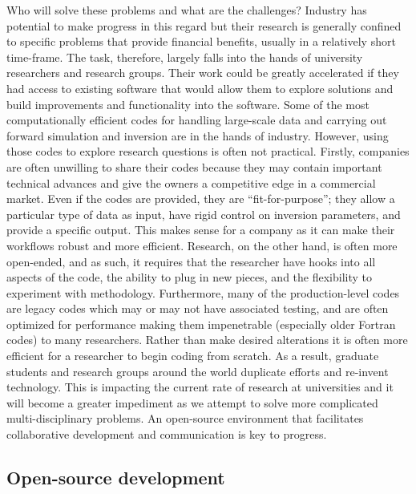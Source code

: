 \documentclass[paper]{geophysics}
\begin{document}
Who will solve these problems and what are the challenges? Industry has potential to make progress in this regard but their research is generally confined to specific problems that provide financial benefits, usually in a relatively short time-frame. The task, therefore, largely falls into the hands of university researchers and research groups. Their work could be greatly accelerated if they had access to existing software that would allow them to explore solutions and build improvements and functionality into the software. Some of the most computationally efficient codes for handling large-scale data and carrying out forward simulation and inversion are in the hands of industry. However, using those codes to explore research questions is often not practical. Firstly, companies are often unwilling to share their codes because they may contain important technical advances and give the owners a competitive edge in a commercial market. Even if the codes are provided, they are ``fit-for-purpose''; they allow a particular type of data as input, have rigid control on inversion parameters, and provide a specific output. This makes sense for a company as it can make their workflows robust and more efficient. Research, on the other hand, is often more open-ended, and as such, it requires that the researcher have hooks into all aspects of the code, the ability to plug in new pieces, and the flexibility to experiment with methodology. Furthermore, many of the production-level codes are legacy codes which may or may not have associated testing, and are often optimized for performance making them impenetrable (especially older Fortran codes) to many researchers. Rather than make desired alterations it is often more efficient for a researcher to begin coding from scratch. As a result, graduate students and research groups around the world duplicate efforts and re-invent technology. This is impacting the current rate of research at universities and it will become a greater impediment as we attempt to solve more complicated multi-disciplinary problems. An open-source environment that facilitates collaborative development and communication is key to progress.


\subsection{Open-source development}
\end{document}
